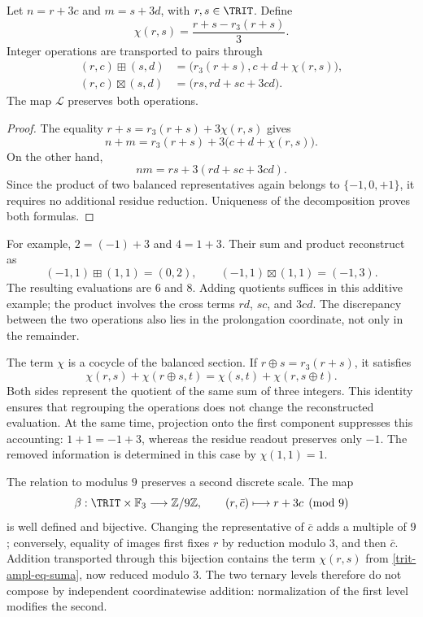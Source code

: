 \begin{proposition}
\label{trit-ampl-prop-aritmetica}
Let \(n=r+3c\) and \(m=s+3d\), with \(r,s\in\TRIT\). Define
\[
 \chi(r,s)=\frac{r+s-r_3(r+s)}3.
\]
Integer operations are transported to pairs through
\begin{align}
 (r,c)\boxplus(s,d)
 &=\bigl(r_3(r+s),c+d+\chi(r,s)\bigr),
 \label{trit-ampl-eq-suma}\\
 (r,c)\boxtimes(s,d)
 &=\bigl(rs,rd+sc+3cd\bigr).
 \label{trit-ampl-eq-producto}
\end{align}
The map \(\mathcal L\) preserves both operations.
\end{proposition}
\begin{proof}
The equality \(r+s=r_3(r+s)+3\chi(r,s)\) gives
\[
 n+m=r_3(r+s)+3\bigl(c+d+\chi(r,s)\bigr).
\]
On the other hand,
\[
 nm=rs+3(rd+sc+3cd).
\]
Since the product of two balanced representatives again belongs to
\(\{-1,0,+1\}\), it requires no additional residue reduction. Uniqueness
of the decomposition proves both formulas.
\end{proof}

For example, \(2=(-1)+3\) and \(4=1+3\). Their sum and product reconstruct
as
\[
 (-1,1)\boxplus(1,1)=(0,2),\qquad
 (-1,1)\boxtimes(1,1)=(-1,3).
\]
The resulting evaluations are \(6\) and \(8\). Adding quotients suffices
in this additive example; the product involves the cross terms
\(rd\), \(sc\), and \(3cd\). The discrepancy between the two operations
also lies in the prolongation coordinate, not only in the remainder.

The term \(\chi\) is a cocycle of the balanced section. If
\(r\oplus s=r_3(r+s)\), it satisfies
\[
 \chi(r,s)+\chi(r\oplus s,t)
 =\chi(s,t)+\chi(r,s\oplus t).
\]
Both sides represent the quotient of the same sum of three integers.
This identity ensures that regrouping the operations does not change the
reconstructed evaluation. At the same time, projection onto the first
component suppresses this accounting: \(1+1=-1+3\), whereas the residue
readout preserves only \(-1\). The removed information is
determined in this case by \(\chi(1,1)=1\).

The relation to modulus \(9\) preserves a second discrete scale.
The map
\[
 \beta:\TRIT\times\mathbb F_3\longrightarrow\mathbb Z/9\mathbb Z,
 \qquad (r,\bar c)\longmapsto r+3c\pmod9
\]
is well defined and bijective. Changing the representative of \(\bar c\)
adds a multiple of \(9\); conversely, equality of images first fixes
\(r\) by reduction modulo \(3\), and then \(\bar c\). Addition
transported through this bijection contains the term
\(\chi(r,s)\) from \eqref{trit-ampl-eq-suma}, now reduced modulo \(3\).
The two ternary levels therefore do not compose by independent
coordinatewise addition: normalization of the first level modifies
the second.

